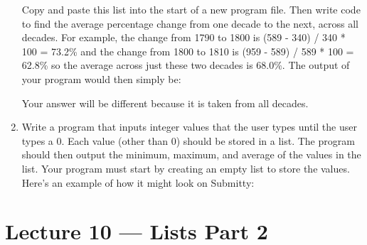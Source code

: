 \documentclass[letterpaper,10pt,english]{sphinxmanual}
\begin{document}
\begin{enumerate}
Copy and paste this list into the start of a new program file.
Then write code to find the average percentage change from one
decade to the next, across all decades. For example, the change
from 1790 to 1800 is (589 - 340) / 340 * 100 = 73.2\% and the change
from 1800 to 1810 is (959 - 589) / 589 * 100 = 62.8\% so the average
across just these two decades is 68.0\%. The output of your program
would then simply be:

\begin{sphinxVerbatim}[commandchars=\\\{\}]
  
\end{sphinxVerbatim}

Your answer will be different because it is taken from all
decades.

\item {} 
Write a program that inputs integer values that the user types
until the user types a 0. Each value (other than 0) should be
stored in a list. The program should then output the minimum,
maximum, and average of the values in the list. Your program must
start by creating an empty list to store the values. Here’s an
example of how it might look on Submitty:

\begin{sphinxVerbatim}[commandchars=\\\{\}]
      
      
      
      
 
 
 
\end{sphinxVerbatim}

\end{enumerate}


\chapter{Lecture 10 — Lists Part 2}
\label{\detokenize{lecture_notes/lec10_lists2:lecture-10-lists-part-2}}\label{\detokenize{lecture_notes/lec10_lists2::doc}}
\end{document}
